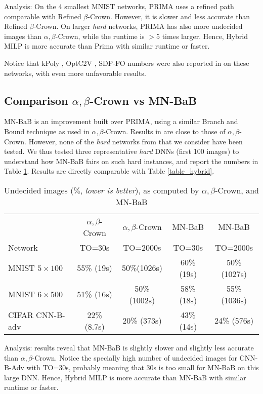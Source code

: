 Analysis: On the 4 smallest MNIST networks, PRIMA uses a refined path comparable with Refined $\beta$-Crown. However, it is slower and less accurate than Refined $\beta$-Crown.
On larger {\em hard} networks, PRIMA has also more undecided images than $\alpha,\beta$-Crown, while the runtime is $>5$ times larger.
Hence, Hybrid MILP is more accurate than Prima with similar runtime or faster.

Notice that kPoly \cite{kpoly}, OptC2V \cite{optC2V}, SDP-FO \cite{SDPFI} numbers were also reported in \cite{crown} on these networks, with even more unfavorable results.

\subsection*{Comparison $\alpha,\beta$-Crown vs MN-BaB}

MN-BaB \cite{ferrari2022complete} is an improvement built over PRIMA, using a similar Branch and Bound technique as used in $\alpha,\beta$-Crown. Results in \cite{ferrari2022complete}
are close to those of $\alpha,\beta$-Crown. However, none of the {\em hard} networks from \cite{crown} that we consider have been tested. We thus tested three representative {\em hard} DNNs (first 100 images) to understand how MN-BaB fairs on such hard instances, and report the numbers in Table \ref{table10}. Results are directly comparable with Table \ref{table_hybrid}.


\begin{table}[h!]
	\centering
	\begin{tabular}{||l||c|c||c|c||}
		\hline \hline
		 & $\alpha,\beta$-Crown & $\alpha,\beta$-Crown & MN-BaB & MN-BaB \\ 
		 Network & TO=30s & TO=2000s &  TO=30s & TO=2000s \\ 
		\hline
		MNIST $5 \times 100$ & 55\% (19s) & 50\%(1026s) & 60\% (19s) & 50\% (1027s) \\ \hline
		MNIST $6 \times 500$ & 51\% (16s) & 50\% (1002s) & 58\% (18s) & 55\% (1036s) \\ \hline
		CIFAR CNN-B-adv & 22\% (8.7s) & 20\% (373s) & 43\% (14s) & 24\% (576s) \\ \hline 
	\end{tabular}
	\caption{Undecided images ($\%$, {\em lower is better}), as computed by $\alpha,\beta$-Crown, and MN-BaB}
	\label{table10}
\end{table}

Analysis: results reveal that MN-BaB is slightly slower and slightly less accurate than $\alpha,\beta$-Crown. Notice the specially high number of undecided images for CNN-B-Adv with TO=30s, probably meaning that 30s is too small for MN-BaB on this large DNN.
Hence, Hybrid MILP is more accurate than MN-BaB with similar runtime or faster.

